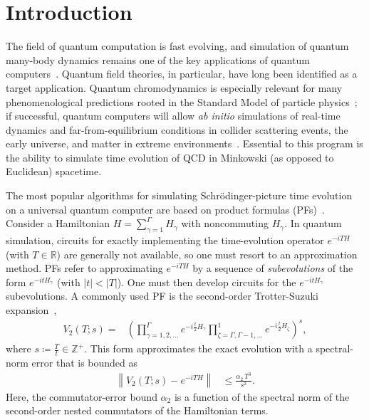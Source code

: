 \documentclass[aps,prd,twocolumn,showpacs,groupedaddress,superscriptaddress,nofootinbib,floatfix,preprintnumbers,longbibliography]{revtex4-1}
\begin{document}
\maketitle

\tableofcontents

\section{\label{sec: Introduction}Introduction}

The field of quantum computation is fast evolving, and simulation of quantum many-body dynamics remains one of the key applications of quantum computers~\cite{Feynman:1981tf,Georgescu:2013oza,Daley:2022eja}. Quantum field theories, in particular, have long been identified as a target application. Quantum chromodynamics is especially relevant for many phenomenological predictions rooted in the Standard Model of particle physics~\cite{Gross:2022hyw,Achenbach:2023pba}; if successful, quantum computers will allow \emph{ab initio} simulations of real-time dynamics and far-from-equilibrium conditions in collider scattering events, the early universe, and matter in extreme environments~\cite{Klco:2021lap,Bauer:2022hpo,DiMeglio:2023nsa,Bauer:2023qgm,Beck:2023xhh,Funcke:2023jbq,Halimeh:2025vvp,Davoudi:2025kxb,Davoudi:2026ghz}. Essential to this program is the ability to simulate time evolution of QCD in Minkowski (as opposed to Euclidean) spacetime.

The most popular algorithms for simulating Schr\"odinger-picture time evolution on a universal quantum computer are based on product formulas (PFs)~\cite{Lloyd:1996aai}. Consider a Hamiltonian $H=\sum_{\gamma=1}^{\Gamma} H_\gamma $ with noncommuting $H_\gamma$. In quantum simulation, circuits for exactly implementing the time-evolution operator $e^{-i T H}$ (with $T\in \mathbb{R}$) are generally not available, so one must resort to an approximation method. PFs refer to approximating $e^{-i T H} $ by a sequence of \emph{subevolutions} of the form $e^{-i tH_\gamma}$ (with $|t|<|T|$). One must then develop circuits for the $e^{-i t H_\gamma}$ subevolutions. A commonly used PF is the second-order Trotter-Suzuki expansion~\cite{Trotter:1959ytf,Suzuki:1976be},
%
\begin{align}
    V_2(T;s) = &\left( \prod_{\gamma=1,2,...}^{\Gamma} e^{-i \frac{t}{2} H_\gamma} \prod_{\zeta=\Gamma, \Gamma-1, ...}^{1} e^{-i \frac{t}{2} H_{\zeta}} \right)^s,
    \label{eq:V2}
\end{align}
%
where $s\coloneq \tfrac{T}{t} \in \mathbb{Z}^+$. This form approximates the exact evolution with a spectral-norm error that is bounded as~\cite{Childs:2019hts}
%
\begin{align}
\left\|V_{2}(T;s)-e^{-iT H}\right\| &\leq 
\frac{\alpha_2\,T^{3}}{s^2}.
\label{eq:p2-formula}
\end{align}
%
Here, the commutator-error bound $\alpha_2$ is a function of the spectral norm of the second-order nested commutators of the Hamiltonian terms. 
\end{document}
